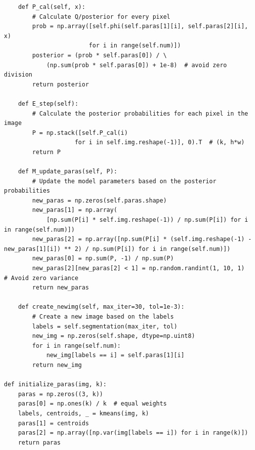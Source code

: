 \documentclass[UTF8]{ctexart}
\begin{document}
\begin{lstlisting}
    def P_cal(self, x):
        # Calculate Q/posterior for every pixel
        prob = np.array([self.phi(self.paras[1][i], self.paras[2][i], x)
                        for i in range(self.num)])
        posterior = (prob * self.paras[0]) / \
            (np.sum(prob * self.paras[0]) + 1e-8)  # avoid zero division
        return posterior

    def E_step(self):
        # Calculate the posterior probabilities for each pixel in the image
        P = np.stack([self.P_cal(i)
                    for i in self.img.reshape(-1)], 0).T  # (k, h*w)
        return P

    def M_update_paras(self, P):
        # Update the model parameters based on the posterior probabilities
        new_paras = np.zeros(self.paras.shape)
        new_paras[1] = np.array(
            [np.sum(P[i] * self.img.reshape(-1)) / np.sum(P[i]) for i in range(self.num)])
        new_paras[2] = np.array([np.sum(P[i] * (self.img.reshape(-1) - new_paras[1][i]) ** 2) / np.sum(P[i]) for i in range(self.num)])
        new_paras[0] = np.sum(P, -1) / np.sum(P)
        new_paras[2][new_paras[2] < 1] = np.random.randint(1, 10, 1)  # Avoid zero variance
        return new_paras
    
    def create_newimg(self, max_iter=30, tol=1e-3):
        # Create a new image based on the labels
        labels = self.segmentation(max_iter, tol)
        new_img = np.zeros(self.shape, dtype=np.uint8)
        for i in range(self.num):
            new_img[labels == i] = self.paras[1][i]
        return new_img
    
def initialize_paras(img, k):
    paras = np.zeros((3, k))
    paras[0] = np.ones(k) / k  # equal weights
    labels, centroids, _ = kmeans(img, k)
    paras[1] = centroids
    paras[2] = np.array([np.var(img[labels == i]) for i in range(k)])
    return paras
\end{lstlisting}
\end{document}
